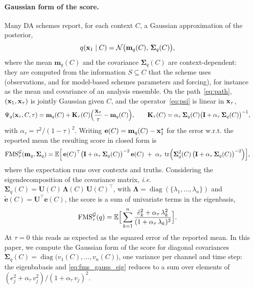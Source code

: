 \paragraph{Gaussian form of the score.}
Many DA schemes report, for each context $C$, a Gaussian approximation of the
posterior,
\begin{equation}\label{eq:gauss_q}
  q(\mathbf{x}_1 \mid C) = \mathcal{N}\big(\mathbf{m}_q(C),\, \boldsymbol{\Sigma}_q(C)\big),
\end{equation}
where the mean $\mathbf{m}_q(C)$ and the covariance $\boldsymbol{\Sigma}_q(C)$ are context-dependent: they are computed from the information $S \subseteq C$ that the scheme uses (observations, and for model-based schemes parameters and forcing), for instance as the mean and covariance of an analysis ensemble. On the
path~\eqref{eq:path}, $(\mathbf{x}_1, \mathbf{x}_\tau)$ is jointly Gaussian given $C$, and the
operator~\eqref{eq:psi} is linear in $\mathbf{x}_\tau$,
\begin{equation}\label{eq:psi_gauss}
  \Psi_q(\mathbf{x}_\tau, C, \tau) = \mathbf{m}_q(C)
  + \mathbf{K}_\tau(C)\Big(\frac{\mathbf{x}_\tau}{\tau} - \mathbf{m}_q(C)\Big),
  \qquad
  \mathbf{K}_\tau(C) = \alpha_\tau\,\boldsymbol{\Sigma}_q(C)\big(\mathbf{I} + \alpha_\tau\,\boldsymbol{\Sigma}_q(C)\big)^{-1},
\end{equation} 
with $\alpha_\tau = \tau^2/(1-\tau)^2$. Writing $\mathbf{e}(C) = \mathbf{m}_q(C) - \mathbf{x}_1^\star$
for the error w.r.t. the reported mean the resulting score in closed form is
\begin{equation}\label{eq:fms_gauss_full}
  \mathrm{FMS}_\tau^{\mathcal{G}}(\mathbf{m}_q,\boldsymbol{\Sigma}_q) = \mathbb{E}\Big[\,
    \mathbf{e}(C)^\top \big(\mathbf{I} + \alpha_\tau\,\boldsymbol{\Sigma}_q(C)\big)^{-2}\,\mathbf{e}(C)
    \;+\; \alpha_\tau\, \operatorname{tr}\!\Big(\boldsymbol{\Sigma}_q^2(C)\,\big(\mathbf{I} +
    \alpha_\tau\,\boldsymbol{\Sigma}_q(C)\big)^{-2}\Big)
  \Big],
\end{equation}
where the expectation runs over contexts and truths.  Considering the eigendecomposition of the covariance matrix, {\em i.e.} $\boldsymbol{\Sigma}_q(C) =  \mathbf{U}(C)\,\boldsymbol{\Lambda}(C)\,\mathbf{U}(C)^\top$, with $\boldsymbol{\Lambda}= \operatorname{diag}(\{\lambda_1,\ldots,\lambda_n\})$ and $\tilde{\mathbf{e}} (C) = \mathbf{U}^\top \mathbf{e}(C)$, the score is a sum of univariate terms in the eigenbasis,
\begin{equation}\label{eq:fms_gauss_eig}
  \mathrm{FMS}_\tau^{\mathcal{G}}(q) = \mathbb{E}\Big[\sum_{k=1}^{n}
    \frac{\tilde e_k^2 + \alpha_\tau \,\lambda_k^2}{(1 + \alpha_\tau \,\lambda_k)^2}\Big].
\end{equation}
At $\tau = 0$ this reads as expected as the squared error of the reported mean. 
In this paper, we compute the Gaussian form of the score for diagonal covariances $\boldsymbol{\Sigma}_q(C) = \operatorname{diag}\big(v_1(C), \dots, v_n(C)\big)$, one variance per channel and time step: the eigenbabasis and
\eqref{eq:fms_gauss_eig} reduces to a sum over elements of
$(e_j^2 + \alpha_\tau \, v_j^2)/(1 + \alpha_\tau \, v_j)^2$. 

